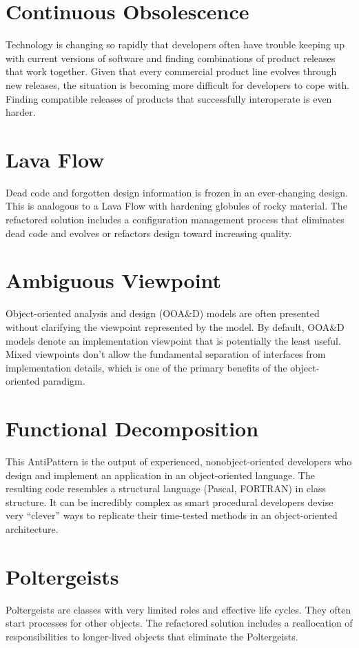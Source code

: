 \documentclass{book}
\begin{document}
\chapter{Continuous Obsolescence}
Technology is changing so rapidly that developers often have trouble keeping up with current versions of software and finding combinations of product releases that work together.
Given that every commercial product line evolves through new releases, the situation is becoming more difficult for developers to cope with.
Finding compatible releases of products that successfully interoperate is even harder.
\chapter{Lava Flow}
Dead code and forgotten design information is frozen in an ever-changing design. This is analogous to a Lava Flow with hardening globules of rocky material.
The refactored solution includes a configuration management process that eliminates dead code and evolves or refactors design toward increasing quality.
\chapter{Ambiguous Viewpoint}
Object-oriented analysis and design (OOA\&D) models are often presented without clarifying the viewpoint represented by the model.
By default, OOA\&D models denote an implementation viewpoint that is potentially the least useful.
Mixed viewpoints don’t allow the fundamental separation of interfaces from implementation details, which is one of the primary benefits of the object-oriented paradigm.
\chapter{Functional Decomposition}
This AntiPattern is the output of experienced, nonobject-oriented developers who design and implement an application in an object-oriented language.
The resulting code resembles a structural language (Pascal, FORTRAN) in class structure.
It can be incredibly complex as smart procedural developers devise very “clever” ways to replicate their time-tested methods in an object-oriented architecture.
\chapter{Poltergeists}
Poltergeists are classes with very limited roles and effective life cycles. They often start processes for other objects.
The refactored solution includes a reallocation of responsibilities to longer-lived objects that eliminate the Poltergeists.
\end{document}
